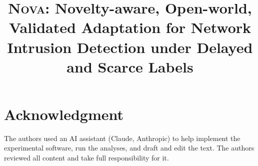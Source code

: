 \documentclass[conference,a4paper]{IEEEtran}
\newcommand{\nova}{\textsc{Nova}}
\begin{document}
\title{\nova: Novelty-aware, Open-world, Validated Adaptation for Network Intrusion Detection under Delayed and Scarce Labels}

\author{
}

\maketitle











\section*{Acknowledgment}
The authors used an AI assistant (Claude, Anthropic) to help implement the experimental software, run the
analyses, and draft and edit the text. The authors reviewed all content and take full responsibility for it.



\end{document}
